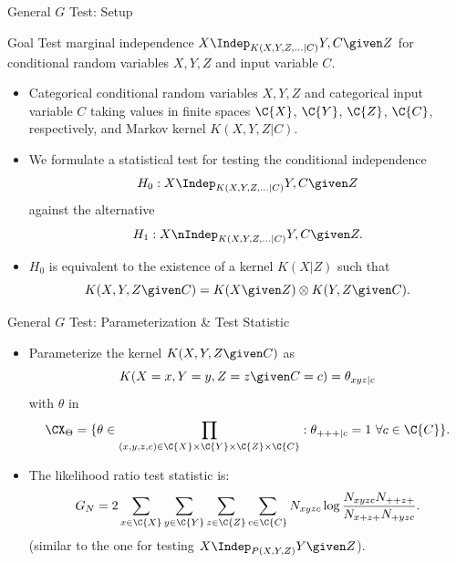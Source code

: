 
\begin{frame}{General $G$ Test: Setup}
  
  \begin{block}{Goal}
    Test marginal independence $X \Indep_{K(X,Y,Z,\dots|C)} Y, C \given Z$ for conditional random variables $X,Y,Z$ and input variable $C$.
  \end{block}
  \begin{itemize}
    \item Categorical conditional random variables $X,Y,Z$ and categorical input variable $C$ taking values in finite spaces $\C{X}$, $\C{Y}$, $\C{Z}$, $\C{C}$, respectively, and Markov kernel $K(X,Y,Z|C)$.
    \item We formulate a statistical test for testing the conditional independence
      $$H_0 : X \Indep_{K(X,Y,Z,\dots|C)} Y, C \given Z$$
      against the alternative
      $$H_1 : X \nIndep_{K(X,Y,Z,\dots|C)} Y, C \given Z.$$
    \item $H_0$ is equivalent to the existence of a kernel $K(X|Z)$ such that
      $$K(X,Y,Z \given C) = K(X \given Z) \otimes K(Y,Z \given C).$$
  \end{itemize}
\end{frame}

\begin{frame}{General $G$ Test: Parameterization \& Test Statistic}
  \begin{itemize}
    \item
Parameterize the kernel $K(X,Y,Z \given C)$ as
$$K(X=x,Y=y,Z=z \given C=c) = \theta_{xyz|c}$$
with $\theta$ in 
      $$\CX_\Theta = \{ \theta \in \prod_{(x,y,z,c) \in \C{X}\times\C{Y}\times\C{Z}\times\C{C}} : \theta_{+++|c} = 1 \ \forall c\in\C{C} \}.$$
    \item The likelihood ratio test statistic is:
\begin{equation*}
  G_N = 2 \sum_{x\in\C{X}}\sum_{y\in\C{Y}}\sum_{z\in\C{Z}}\sum_{c\in\C{C}}
  N_{xyzc} \log \frac{N_{xyzc} N_{++z+}}{N_{x+z+} N_{+yzc}}.
\end{equation*}
      (similar to the one for testing $X \Indep_{P(X,Y,Z)} Y \given Z$).
  \end{itemize}
\end{frame}

